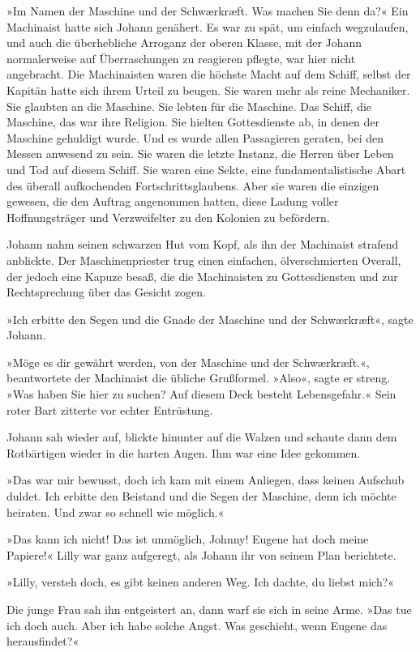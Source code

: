 »Im Namen der Maschine und der Schwærkræft. Was machen Sie denn
da?« Ein Machinaist hatte sich Johann genähert. Es war zu spät, um
einfach wegzulaufen, und auch die überhebliche Arroganz der oberen
Klasse, mit der Johann normalerweise auf Überraschungen zu
reagieren pflegte, war hier nicht angebracht. Die Machinaisten
waren die höchste Macht auf dem Schiff, selbst der Kapitän hatte
sich ihrem Urteil zu beugen. Sie waren mehr als reine Mechaniker.
Sie glaubten an die Maschine. Sie lebten für die Maschine. Das
Schiff, die Maschine, das war ihre Religion. Sie hielten
Gottesdienste ab, in denen der Maschine gehuldigt wurde. Und es
wurde allen Passagieren geraten, bei den Messen anwesend zu sein.
Sie waren die letzte Instanz, die Herren über Leben und Tod auf
diesem Schiff. Sie waren eine Sekte, eine fundamentalistische Abart
des überall aufkochenden Fortschrittsglaubens. Aber sie waren die
einzigen gewesen, die den Auftrag angenommen hatten, diese Ladung
voller Hoffnungsträger und Verzweifelter zu den Kolonien zu
befördern.

Johann nahm seinen schwarzen Hut vom Kopf, als ihn der Machinaist
strafend anblickte. Der Maschinenpriester trug einen einfachen,
ölverschmierten Overall, der jedoch eine Kapuze besaß, die die
Machinaisten zu Gottesdiensten und zur Rechtsprechung über das
Gesicht zogen.

»Ich erbitte den Segen und die Gnade der Maschine und der
Schwærkræft«, sagte Johann.

»Möge es dir gewährt werden, von der Maschine und der
Schwærkræft.«, beantwortete der Machinaist die übliche Grußformel.
»Also«, sagte er streng. »Was haben Sie hier zu suchen? Auf diesem
Deck besteht Lebensgefahr.« Sein roter Bart zitterte vor echter
Entrüstung.

Johann sah wieder auf, blickte hinunter auf die Walzen und schaute
dann dem Rotbärtigen wieder in die harten Augen. Ihm war eine Idee
gekommen.

»Das war mir bewusst, doch ich kam mit einem Anliegen, dass keinen
Aufschub duldet. Ich erbitte den Beistand und die Segen der
Maschine, denn ich möchte heiraten. Und zwar so schnell wie
möglich.«

\tb

»Das kann ich nicht! Das ist unmöglich, Johnny! Eugene hat doch
meine Papiere!« Lilly war ganz aufgeregt, als Johann ihr von seinem
Plan berichtete.

»Lilly, versteh doch, es gibt keinen anderen Weg. Ich dachte, du
liebst mich?«

Die junge Frau sah ihn entgeistert an, dann warf sie sich in seine
Arme. »Das tue ich doch auch. Aber ich habe solche Angst. Was
geschieht, wenn Eugene das herausfindet?«

